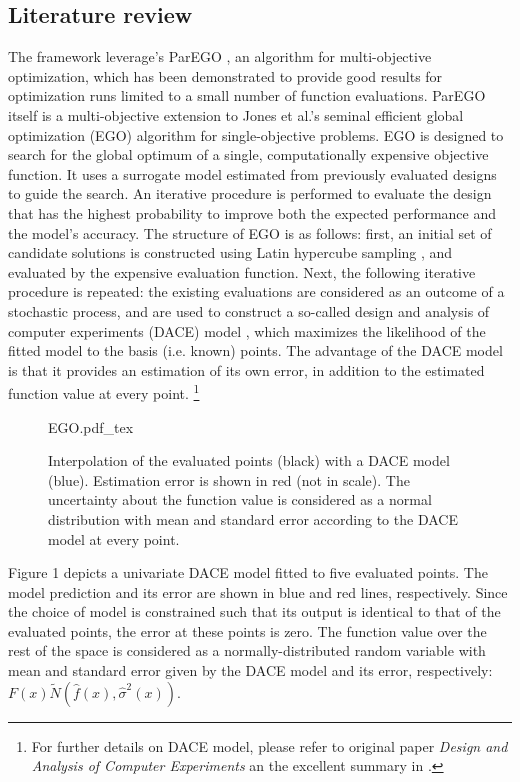\documentclass[10pt]{llncs}
\begin{document}
\subsection{\label{sec:intro}Literature review}

The framework leverage's ParEGO \cite{knowles2005multiobjective,Knowles200650}, an algorithm for multi-objective optimization, which has been demonstrated to provide good results for optimization runs limited to a small number of function evaluations. ParEGO itself is a multi-objective extension to Jones et al.'s \cite{Jones1998Efficient} seminal efficient global optimization (EGO) algorithm for single-objective problems. EGO is designed to search for the global optimum of a single, computationally expensive objective function. It uses a surrogate model estimated from previously evaluated designs to guide the search. An iterative procedure is performed to evaluate the design that has the highest probability to improve both
the expected performance and the model's accuracy. The structure of EGO is as follows: first, an initial set of candidate solutions is constructed using Latin hypercube sampling \cite{Scheffe1958Experiments}, and evaluated by the expensive evaluation function. Next, the following iterative procedure is repeated: the existing evaluations are considered as an outcome of a stochastic process, and are used to construct a so-called design and analysis of computer experiments (DACE) model \cite{Sacks1989Design}, which maximizes the likelihood of the fitted model to the basis (i.e. known) points. The advantage of the DACE model is that it provides an estimation of its own error, in addition to the estimated function value at every point. \footnote{For further details on DACE model, please refer to original paper \textit{Design and Analysis of Computer Experiments} \cite{Sacks1989Design} an the excellent summary in \cite{Jones1998Efficient}.} 
\begin{figure}
\centering
\def\svgwidth{0.70\textwidth}
{EGO.pdf_tex}
\caption{Interpolation of the evaluated points (black) with a DACE model (blue). Estimation error is shown in red (not in scale). The uncertainty about the function value is considered as a normal distribution with mean and standard error according to the DACE model at every point.}
\label{fig:convergence}
\end{figure}

Figure 1 depicts a univariate DACE model fitted to five evaluated points. The model prediction and its error are shown in blue and red lines, respectively. Since the choice of model is constrained such that its output is identical to that of the evaluated points, the error at these points is zero. The function value over the rest of the space is considered as a normally-distributed random variable with mean and standard error given by the DACE model and its error, respectively: $F(x)\tilde{N}(\hat{f}(x),{\hat{\sigma}}^2(x))$.
\end{document}
